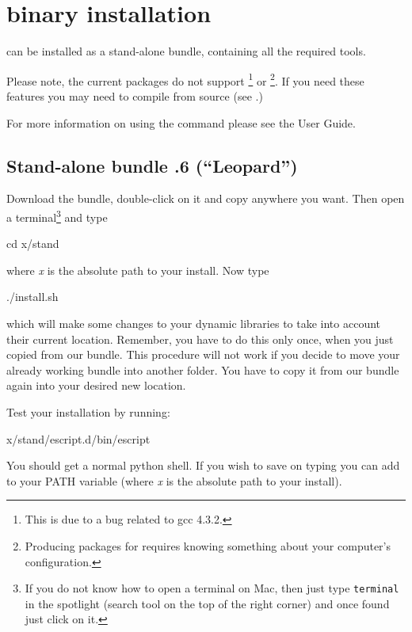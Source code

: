 %
%
%

\section{\macosx binary installation}
\label{sec:binmac}

\esfinley can be installed as a stand-alone bundle, containing all the required tools.

Please note, the current packages do not support \openmp\footnote{This is due to a bug related to gcc 4.3.2.} or \mpi\footnote{Producing packages for \mpi requires knowing something about your computer's configuration.}.
If you need these features you may need to compile \esfinley from source (see .)

For more information on using the  command please see the User Guide.

\subsection{Stand-alone bundle .6 (``Leopard'')}

Download the bundle, double-click on it and copy   anywhere you want.
Then open a terminal\footnote{If you do not know how to open a terminal on Mac, then just type \texttt{terminal} in the spotlight (search tool on the top of the right corner) and once found just click on it.} and type
\begin{shellCode}
cd x/stand 
\end{shellCode}
where \textit{x} is the absolute path to your install. 
Now type
\begin{shellCode}
./install.sh 
\end{shellCode}
which will make some changes to your dynamic libraries to take into account their current location. Remember, you have  to do this only once, when you just copied from our bundle. This procedure will not work if you decide to move your already working bundle into another folder. You have to copy it from our bundle again into your desired new location.

Test your installation by running:
\begin{shellCode}
 x/stand/escript.d/bin/escript
\end{shellCode}
You should get a normal python shell.
If you wish to save on typing you can add  to your PATH variable (where \textit{x} is the absolute path to your install). 

